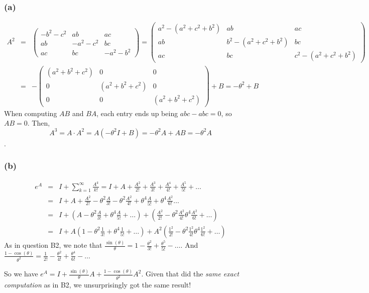 \documentclass{article}
\newcommand{\threematrix}[9]{\left(\begin{array}{ccc} #1 & #2 & #3\\ #4 & #5 & #6 \\ #7 & #8 & #9 \end{array}\right)}
\begin{document}
\subsubsection{(a)}
\begin{eqnarray*}
  A^2 &=& 
  \left( \begin{array}{ccc}
  -b^2 - c^2 & ab & ac\\
  ab & -a^2 - c^2 & bc\\
  ac & bc & -a^2 - b^2
  \end{array}\right) = 
  \left( \begin{array}{ccc}
  a^2 -(a^2 + c^2 + b^2) & ab & ac\\
  ab & b^2 -(a^2 + c^2 + b^2)& bc\\
  ac & bc & c^2 -(a^2 + c^2 + b^2)
  \end{array}\right) \\
  &=& -\threematrix{(a^2+b^2+c^2)}{0}{0}{0}{(a^2+b^2+c^2)}{0}{0}{0}{(a^2+b^2+c^2)}
  + B = -\theta^2 + B
\end{eqnarray*}
When computing $AB$ and $BA$, each entry ends up being $abc - abc = 0$, so $AB = 0$.
Then, \[A^3 = A\cdot A^2 = A(-\theta^2I + B) = -\theta^2A + AB = -\theta^2A\].

\subsubsection{(b)}
\begin{eqnarray*}
  e^A &=&  I + \sum_{k=1}^\infty \frac{A^k}{k!} = 
  I + A + \frac{A^2}{2!} + \frac{A^3}{3!} + \frac{A^4}{4!} + \frac{A^5}{5!} + \dots \\
  &=& I + A + \frac{A^2}{2!} -\theta^2 \frac{A}{3!} -\theta^2 \frac{A^2}{4!} + \theta^4 \frac{A}{5!} +  \theta^4 \frac{A^2}{6!} \dots \\
  &=& I + \left(A - \theta^2 \frac{A}{3!} + \theta^4 \frac{A}{5!} + \dots \right) + \left( \frac{A^2}{2!} - \theta^2 \frac{A^2}{4!}  \theta^4 \frac{A^2}{6!} + \dots \right)\\
  &=& I + A\left(1 - \theta^2 \frac{1}{3!} + \theta^4 \frac{1}{5!} + \dots \right) + A^2\left( \frac{1^2}{2!} - \theta^2 \frac{1^2}{4!}  \theta^4 \frac{1^2}{6!} + \dots \right)
 \end{eqnarray*}
 As in question B2, we note that 
$\frac{\sin(\theta)}{\theta} = 1 - \frac{\theta^2}{3!} + \frac{\theta^5}{5!} - \dots $.
And
$\frac{1 - \cos(\theta)}{\theta^2} = \frac{1}{2!} - \frac{\theta^2}{4!} + \frac{\theta^4}{6!} - \dots $

So we have $e^A = I + \frac{\sin(\theta)}{\theta}A + \frac{1-\cos(\theta)}{\theta^2}A^2$.
Given that did the \textsl{same exact computation} as in B2, we unsurprisingly got the same result!
\end{document}
